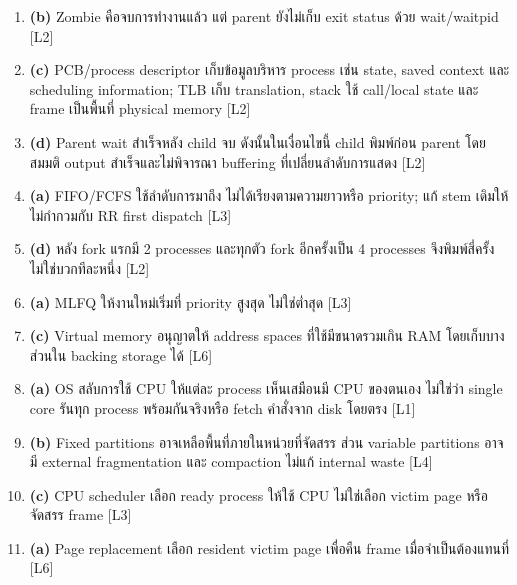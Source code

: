 \newpage{}
\begin{enumerate}[leftmargin=1.4em,start=12,itemsep=0.18cm]
\item \textbf{(b)} Zombie คือจบการทำงานแล้ว แต่ parent ยังไม่เก็บ exit status ด้วย wait/waitpid {\small [L2]}
\item \textbf{(c)} PCB/process descriptor เก็บข้อมูลบริหาร process เช่น state, saved context และ scheduling information; TLB เก็บ translation, stack ใช้ call/local state และ frame เป็นพื้นที่ physical memory {\small [L2]}
\item \textbf{(d)} Parent wait สำเร็จหลัง child จบ ดังนั้นในเงื่อนไขนี้ child พิมพ์ก่อน parent โดยสมมติ output สำเร็จและไม่พิจารณา buffering ที่เปลี่ยนลำดับการแสดง {\small [L2]}
\item \textbf{(a)} FIFO/FCFS ใช้ลำดับการมาถึง ไม่ได้เรียงตามความยาวหรือ priority; แก้ stem เดิมให้ไม่กำกวมกับ RR first dispatch {\small [L3]}
\item \textbf{(d)} หลัง fork แรกมี 2 processes และทุกตัว fork อีกครั้งเป็น 4 processes จึงพิมพ์สี่ครั้ง ไม่ใช่บวกทีละหนึ่ง {\small [L2]}
\item \textbf{(a)} MLFQ ให้งานใหม่เริ่มที่ priority สูงสุด ไม่ใช่ต่ำสุด {\small [L3]}
\item \textbf{(c)} Virtual memory อนุญาตให้ address spaces ที่ใช้มีขนาดรวมเกิน RAM โดยเก็บบางส่วนใน backing storage ได้ {\small [L6]}
\item \textbf{(a)} OS สลับการใช้ CPU ให้แต่ละ process เห็นเสมือนมี CPU ของตนเอง ไม่ใช่ว่า single core รันทุก process พร้อมกันจริงหรือ fetch คำสั่งจาก disk โดยตรง {\small [L1]}
\item \textbf{(b)} Fixed partitions อาจเหลือพื้นที่ภายในหน่วยที่จัดสรร ส่วน variable partitions อาจมี external fragmentation และ compaction ไม่แก้ internal waste {\small [L4]}
\item \textbf{(c)} CPU scheduler เลือก ready process ให้ใช้ CPU ไม่ใช่เลือก victim page หรือจัดสรร frame {\small [L3]}
\item \textbf{(a)} Page replacement เลือก resident victim page เพื่อคืน frame เมื่อจำเป็นต้องแทนที่ {\small [L6]}
\end{enumerate}
\newpage{}
